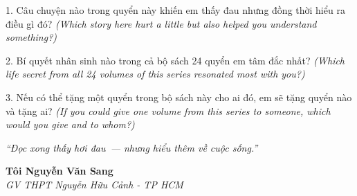 \begin{tuhocnhanh}
1. Câu chuyện nào trong quyển này khiến em thấy đau nhưng đồng thời hiểu ra điều gì đó? \textit{(Which story here hurt a little but also helped you understand something?)}

2. Bí quyết nhân sinh nào trong cả bộ sách 24 quyển em tâm đắc nhất? \textit{(Which life secret from all 24 volumes of this series resonated most with you?)}

3. Nếu có thể tặng một quyển trong bộ sách này cho ai đó, em sẽ tặng quyển nào và tặng ai? \textit{(If you could give one volume from this series to someone, which would you give and to whom?)}
\end{tuhocnhanh}

\begin{center}
\textit{\color{earthgold}``Đọc xong thấy hơi đau~--- nhưng hiểu thêm về cuộc sống.''}
\end{center}

\begin{flushright}
\textbf{Tôi Nguyễn Văn Sang}\\
\textit{GV THPT Nguyễn Hữu Cảnh - TP HCM}
\end{flushright}

\ngancach
